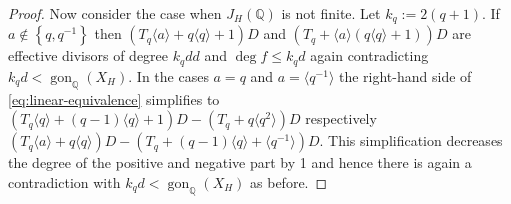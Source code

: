 \documentclass[10pt,a4paper]{amsart}
\DeclareMathOperator{\gon}{gon}
\newcommand{\Q}{\mathbb{Q}}
\newcommand{\diamondop}[1]{\langle #1 \rangle} %
\newcommand{\set}[1]{\left\lbrace #1 \right\rbrace}
\begin{document}
\begin{proof}
Now consider the case when $J_H(\Q)$ is not finite. Let $k_q:=2(q+1)$.
If $a \notin \set{q,q^{-1}}$ then $(T_q\diamondop{a}+q\diamondop{q}+1)D$ and $(T_q +\diamondop{a}(q\diamondop{q}+1))D$ are effective divisors of degree $k_qdd$ and $\deg f \leq k_qd$ again contradicting $k_qd < \gon_\Q(X_H).$
In the cases $a=q$ and $a=\diamondop{q^{-1}}$ the right-hand side of \eqref{eq:linear-equivalence} simplifies to $(T_q\diamondop{q}+(q-1)\diamondop{q}+1)D - (T_q +q\diamondop{q^2})D$ respectively $ (T_q\diamondop{a}+q\diamondop{q})D - (T_q +(q-1)\diamondop{q}+\diamondop{q^{-1}})D.$ This simplification decreases the degree of the positive and negative part by 1 and hence there is again a contradiction with $k_qd < \gon_\Q(X_H)$ as before.
         
\end{proof}
\end{document}
